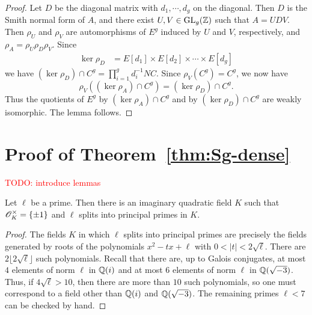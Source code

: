 \documentclass{amsart}
\begin{document}
\begin{proof}
  Let $D$ be the diagonal matrix with $d_1, \cdots, d_g$ on the diagonal.
Then $D$ is the Smith normal form of $A$, and there exist $U,V \in \operatorname{GL}_g(\mathbb{Z})$ such that $A = UDV$. Then $\rho_U$ and $\rho_V$ are automorphisms of $E^g$ induced by $U$ and $V$, respectively, and $\rho_A = \rho_U \rho_D \rho_V$. Since
  \begin{align*}
    \ker \rho_D &= E[d_1] \times E[d_2] \times \cdots \times E[d_g]
  \end{align*}
  we have $(\ker \rho_D) \cap C^g = \prod_{i=1}^g d_i^{-1}NC$. %
 Since $\rho_V(C^g) = C^g$, we now have
  \[
    \rho_V((\ker \rho_A) \cap C^g) = (\ker \rho_D) \cap C^g.
  \]
  Thus the quotients of $E^g$ by $(\ker \rho_A) \cap C^g$ and by $(\ker \rho_D) \cap C^g$ are weakly isomorphic. The lemma follows.
\end{proof}

\section{Proof of Theorem~\ref{thm:Sg-dense}}
\label{sec:step-2}


\textcolor{red}{TODO: introduce lemmas}

\begin{lemma}\label{lem:silly}
  Let $\ell$ be a prime. Then there is an imaginary quadratic field $K$ such that $\mathscr{O}_K^\times = \{\pm 1\}$ and $\ell$ splits into principal primes in $K$.
\end{lemma}
\begin{proof}
  The fields $K$ in which $\ell$ splits into principal primes are precisely the fields generated by roots of the polynomials $x^2 - tx + \ell$ with $0 < |t| < 2\sqrt{\ell}$. There are $2\lfloor 2\sqrt{\ell} \rfloor$ such polynomials. Recall that there are, up to Galois conjugates, at most $4$ elements of norm $\ell$ in $\mathbb{Q}(i)$ and at most $6$ elements of norm $\ell$  in $\mathbb{Q}(\sqrt{-3})$. Thus, if $4\sqrt{\ell} > 10$, then there are more than $10$ such polynomials, so one must correspond to a field other than $\mathbb{Q}(i)$ and $\mathbb{Q}(\sqrt{-3})$. The remaining primes $\ell < 7$ can be checked by hand.
\end{proof}
\end{document}
